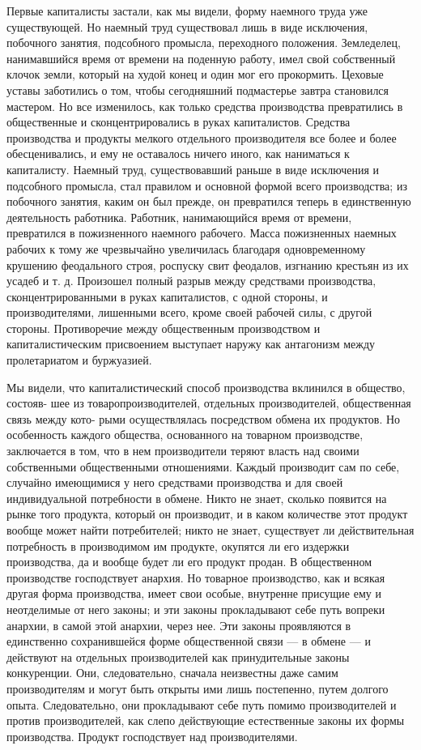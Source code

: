 \documentclass[12pt]{article}
\newcommand{\parnum}{(\arabic{parcount})}
\newcounter{parcount}
\newenvironment{parnumbers}{%
  \par%
  \everypar{\noindent \stepcounter{parcount}\marginpar[]{\parnum}}%
}{}
\begin{document}
\begin{parnumbers}
    Первые капиталисты застали, как мы видели, форму наемного труда уже существующей. Но наемный труд существовал лишь в виде исключения, побочного занятия, подсобного промысла, переходного положения. Земледелец, нанимавшийся время от времени на поденную работу, имел свой собственный клочок земли, который на худой конец и один мог его прокормить. Цеховые уставы заботились о том, чтобы сегодняшний подмастерье завтра становился мастером. Но все изменилось, как только средства производства превратились в общественные и сконцентрировались в руках капиталистов. Средства производства и продукты мелкого отдельного производителя все более и более обесценивались, и ему не оставалось ничего иного, как наниматься к капиталисту. Наемный труд, существовавший раньше в виде исключения и подсобного промысла, стал правилом и основной формой всего производства; из побочного занятия, каким он был прежде, он превратился теперь в единственную деятельность работника. Работник, нанимающийся время от времени, превратился в пожизненного наемного рабочего. Масса пожизненных наемных рабочих к тому же чрезвычайно увеличилась благодаря одновременному крушению феодального строя, роспуску свит феодалов, изгнанию крестьян из их усадеб и т. д. Произошел полный разрыв между средствами производства, сконцентрированными в руках капиталистов, с одной стороны, и производителями, лишенными всего, кроме своей рабочей силы, с другой стороны. Противоречие между общественным производством и капиталистическим присвоением выступает наружу как антагонизм между пролетариатом и буржуазией.

    Мы видели, что капиталистический способ производства вклинился в общество, состояв- шее из товаропроизводителей, отдельных производителей, общественная связь между кото- рыми осуществлялась посредством обмена их продуктов. Но особенность каждого общества, основанного на товарном производстве, заключается в том, что в нем производители теряют власть над своими собственными общественными отношениями. Каждый производит сам по себе, случайно имеющимися у него средствами производства и для своей индивидуальной потребности в обмене. Никто не знает, сколько появится на рынке того продукта, который он производит, и в каком количестве этот продукт вообще может найти потребителей; никто не знает, существует ли действительная потребность в производимом им продукте, окупятся ли его издержки производства, да и вообще будет ли его продукт продан. В общественном производстве господствует анархия. Но товарное производство, как и всякая другая форма производства, имеет свои особые, внутренне присущие ему и неотделимые от него законы; и эти законы прокладывают себе путь вопреки анархии, в самой этой анархии, через нее. Эти законы проявляются в единственно сохранившейся форме общественной связи — в обмене — и действуют на отдельных производителей как принудительные законы конкуренции. Они, следовательно, сначала неизвестны даже самим производителям и могут быть открыты ими лишь постепенно, путем долгого опыта. Следовательно, они прокладывают себе путь помимо производителей и против производителей, как слепо действующие естественные законы их формы производства. Продукт господствует над производителями.


\end{parnumbers}
\end{document}
